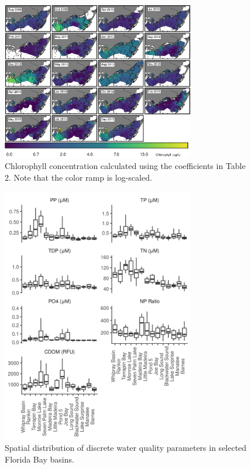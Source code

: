 \begin{figure}
  \centering
  \includegraphics[width=0.75\textwidth]{../../figures/multipanel.png}
  \caption{Chlorophyll concentration calculated using the coefficients in Table 2. Note that the color ramp is log-scaled.}
  \label{fig:4}
\end{figure}

\begin{figure}
  \centering
  \includegraphics[width=0.75\textwidth]{../../figures/nonchlboxplot.png}
  \caption{Spatial distribution of discrete water quality parameters in selected Florida Bay basins.}
  \label{fig:5}
\end{figure}

